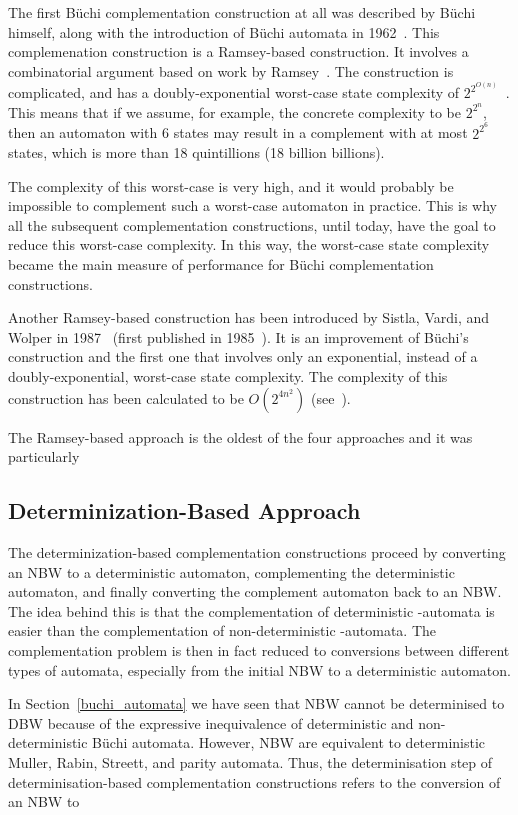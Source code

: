 The first Büchi complementation construction at all was described by Büchi himself, along with the introduction of Büchi automata in 1962~\cite{buchi1960decision}. This complemenation construction is a Ramsey-based construction. It involves a combinatorial argument based on work by Ramsey~\cite{1930ramsey}. The construction is complicated, and has a doubly-exponential worst-case state complexity of $2^{2^{O\left(n\right)}}$~\cite{vardi2005buchi}. This means that if we assume, for example, the concrete complexity to be $2^{2^n}$, then an automaton with 6 states may result in a complement with at most $2^{2^6}$ states, which is more than 18 quintillions (18 billion billions).

The complexity of this worst-case is very high, and it would probably be impossible to complement such a worst-case automaton in practice. This is why all the subsequent complementation constructions, until today, have the goal to reduce this worst-case complexity. In this way, the worst-case state complexity became the main measure of performance for Büchi complementation constructions.

Another Ramsey-based construction has been introduced by Sistla, Vardi, and Wolper in 1987~\cite{PrasadSistla1987217} (first published in 1985~\cite{1985_sistla}). It is an improvement of Büchi's construction and the first one that involves only an exponential, instead of a doubly-exponential, worst-case state complexity. The complexity of this construction has been calculated to be $O\left(2^{4n^2}\right)$ (see~\cite{1988_safra_2}\cite{Pecuchet198695}).

The Ramsey-based approach is the oldest of the four approaches and it was particularly 


\subsection{Determinization-Based Approach}
The determinization-based complementation constructions proceed by converting an NBW to a deterministic automaton, complementing the deterministic automaton, and finally converting the complement automaton back to an NBW. The idea behind this is that the complementation of deterministic \om-automata is easier than the complementation of non-deterministic \om-automata. The complementation problem is then in fact reduced to conversions between different types of automata, especially from the initial NBW to a deterministic automaton.

In Section~\ref{buchi_automata} we have seen that NBW cannot be determinised to DBW because of the expressive inequivalence of deterministic and non-deterministic Büchi automata. However, NBW are equivalent to deterministic Muller, Rabin, Streett, and parity automata. Thus, the determinisation step of determinisation-based complementation constructions refers to the conversion of an NBW to 

